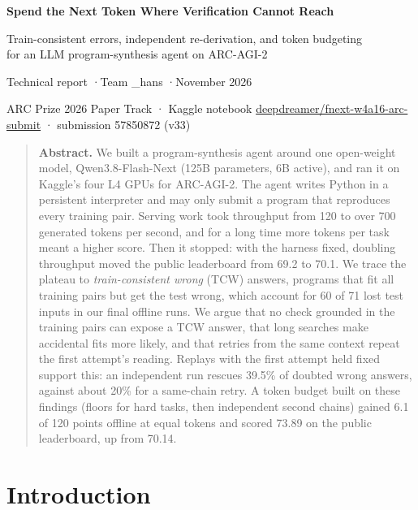 \documentclass[11pt]{article}
\begin{document}
\begin{center}
{\sffamily\bfseries\LARGE Spend the Next Token Where Verification Cannot Reach\par}
\vspace{0.5em}
{\sffamily\large\color{ink2} Train-consistent errors, independent re-derivation, and token budgeting\\ for an LLM program-synthesis agent on ARC-AGI-2\par}
\vspace{0.9em}
{\sffamily Technical report \quad·\quad Team \_hans \quad·\quad November 2026\par}
\vspace{0.2em}
{\sffamily\small\color{ink2} ARC Prize 2026 Paper Track · Kaggle notebook \href{https://www.kaggle.com/code/deepdreamer/fnext-w4a16-arc-submit}{deepdreamer/fnext-w4a16-arc-submit} · submission 57850872 (v33)\par}
\end{center}

\vspace{0.6em}
\begin{quote}\small
\textbf{\sffamily Abstract.} We built a program-synthesis agent around one open-weight model, Qwen3.8-Flash-Next (125B parameters, 6B active), and ran it on Kaggle's four L4 GPUs for ARC-AGI-2. The agent writes Python in a persistent interpreter and may only submit a program that reproduces every training pair. Serving work took throughput from 120 to over 700 generated tokens per second, and for a long time more tokens per task meant a higher score. Then it stopped: with the harness fixed, doubling throughput moved the public leaderboard from 69.2 to 70.1. We trace the plateau to \emph{train-consistent wrong} (TCW) answers, programs that fit all training pairs but get the test wrong, which account for 60 of 71 lost test inputs in our final offline runs. We argue that no check grounded in the training pairs can expose a TCW answer, that long searches make accidental fits more likely, and that retries from the same context repeat the first attempt's reading. Replays with the first attempt held fixed support this: an independent run rescues 39.5\% of doubted wrong answers, against about 20\% for a same-chain retry. A token budget built on these findings (floors for hard tasks, then independent second chains) gained 6.1 of 120 points offline at equal tokens and scored 73.89 on the public leaderboard, up from 70.14.
\end{quote}

\section{Introduction}
\end{document}
